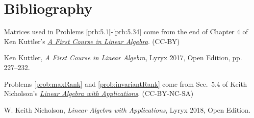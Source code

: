 \documentclass{ximera}
\begin{document}
 
\section*{Bibliography}
Matrices used in Problems \ref{prb:5.1}-\ref{prb:5.34} come from the end of Chapter 4 of Ken Kuttler's \href{https://open.umn.edu/opentextbooks/textbooks/a-first-course-in-linear-algebra-2017}{\it A First Course in Linear Algebra}. (CC-BY)
 
Ken Kuttler, {\it  A First Course in Linear Algebra}, Lyryx 2017, Open Edition, pp. 227--232. 
 
 Problems \ref{prob:maxRank} and \ref{prob:invariantRank} come from Sec.~5.4 of Keith Nicholson's
 \href{https://open.umn.edu/opentextbooks/textbooks/linear-algebra-with-applications}{\it Linear Algebra with Applications}. (CC-BY-NC-SA)
 
W. Keith Nicholson, {\it Linear Algebra with Applications}, Lyryx 2018, Open Edition.
\end{document}
